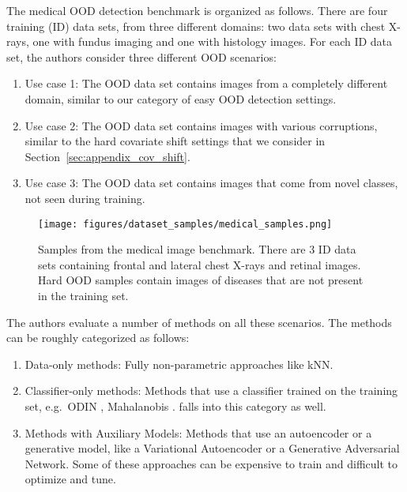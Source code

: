 \vspace{-0.3cm}
The medical OOD detection benchmark is organized as follows. There are four
training (ID) data sets, from three different domains: two data sets with chest
X-rays, one with fundus imaging and one with histology images. For each ID data
set, the authors consider three different OOD scenarios:

\vspace{-0.4cm}
\begin{enumerate}[leftmargin=*]
  \compresslist

  \item Use case 1: The OOD data set contains images from a completely different
    domain, similar to our category of easy OOD detection settings.

  \item Use case 2: The OOD data set contains images with various corruptions,
    similar to the hard covariate shift settings that we consider in
    Section~\ref{sec:appendix_cov_shift}.

  \item Use case 3: The OOD data set contains images that come from novel
    classes, not seen during training.

\end{enumerate}

\vspace{-0.7cm}
\begin{figure}[H]
  \begin{center}
    \texttt{[image: figures/dataset\_samples/medical\_samples.png]}
  \end{center}

\vspace{-0.5cm}
  \caption{Samples from the medical image benchmark. There are 3 ID data sets
  containing frontal and lateral chest X-rays and retinal images. Hard OOD
samples contain images of diseases that are not present in the training set.}

  \label{fig:medical_samples}
\end{figure}

The authors evaluate a number of methods on all these scenarios. The methods can
be roughly categorized as follows:

\begin{enumerate}[leftmargin=*]
  \compresslist

  \item Data-only methods: Fully non-parametric approaches like kNN.

  \item Classifier-only methods: Methods that use a classifier trained on the
    training set, e.g.\ ODIN \citep{odin}, Mahalanobis \citep{mahalanobis}. 
    falls into this category as well.

  \item Methods with Auxiliary Models: Methods that use an autoencoder or a
    generative model, like a Variational Autoencoder or a Generative Adversarial
    Network. Some of these approaches can be expensive to train and difficult to
    optimize and tune.

\end{enumerate}

